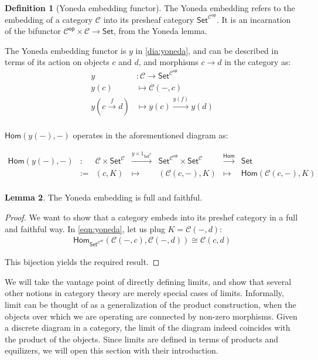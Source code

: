 \documentclass[10pt]{amsart}
\makeatletter
\newcommand{\8}{\ensuremath{\infty}}
\newcommand{\0}{\ensuremath{\overset{\rightarrow}{0}}}
\newcommand{\1}{\ensuremath{\mathbf{1}}}
\newcommand{\C}{\ensuremath{\mathscr{C}}}
\newcommand{\Set}{\ensuremath{\mathsf{Set}}}
\newcommand{\Hom}{\ensuremath{\mathsf{Hom}}}
\newcommand{\op}{\ensuremath{\mathsf{op}}}
\theoremstyle{definition}
\newtheorem{definition}{Definition}[section]
\newtheorem{lemma}[definition]{Lemma}
\def\subsection{\@startsection{subsection}{2}
  \z@{.5\linespacing\@plus.7\linespacing}{.6\baselineskip}{\centering}}
\numberwithin{definition}{subsection}
\numberwithin{definition}{section}
\makeatother
\begin{document}
\begin{definition}[Yoneda embedding functor]
  The Yoneda embedding refers to the embedding of a category $\C$ into its presheaf category $\Set^{\C^\op}$. It is an incarnation of the bifunctor $\C^\op \times \C \rightarrow \Set$, from the Yoneda lemma.

  The Yoneda embedding functor is $y$ in \eqref{dia:yoneda}, and can be described in terms of its action on objects $c$ and $d$, and morphisms $c \rightarrow d$ in the category as:
  \begin{align*}
    y                      & : \C \rightarrow \Set^{\C^\op}       \\
    y(c)                   & \mapsto \C(-, c)                     \\
    y(c \xrightarrow{f} d) & \mapsto y(c) \xrightarrow{y(f)} y(d) \\
  \end{align*}

  $\Hom(y(-), -)$ operates in the aforementioned diagram as:

  \begin{equation*}
    \begin{matrix}
      \Hom(y(-), -) & :  & \C \times \Set^\C & \xrightarrow{y \times 1_{\Set^\C}} & \Set^{\C^\op} \times \Set^\C & \xrightarrow{\Hom} & \Set              \\
                    & := & (c, K)            & \mapsto                            & (\C(c, -), K)                & \mapsto            & \Hom(\C(c, -), K) \\
    \end{matrix}
  \end{equation*}
\end{definition}

\begin{lemma}
  The Yoneda embedding is full and faithful.
\end{lemma}

\begin{proof}
  We want to show that a category embeds into its preshef category in a full and faithful way.
  In \eqref{eqn:yoneda}, let us plug $K = \C(-, d)$:
  \begin{align*}
    \Hom_{\Set^{\C^\op}}(\C(-, c), \C(-, d)) \cong \C(c, d)
  \end{align*}

  This bijection yields the required result.
\end{proof}

\subsection{Limits}
We will take the vantage point of directly defining limits, and show that several other notions in category theory are merely special cases of limits. Informally, limit can be thought of as a generalization of the product construction, when the objects over which we are operating are connected by non-zero morphisms. Given a discrete diagram in a category, the limit of the diagram indeed coincides with the product of the objects. Since limits are defined in terms of products and equilizers, we will open this section with their introduction.
\end{document}
